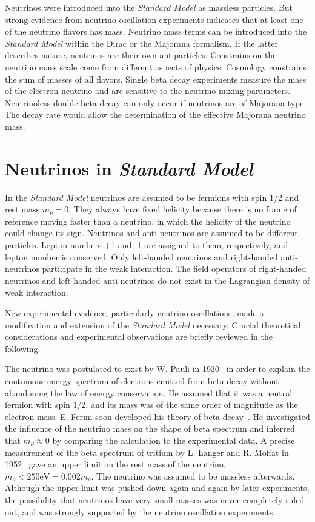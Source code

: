 Neutrinos were introduced into the \emph{Standard Model} as massless particles. But strong evidence from neutrino oscillation experiments indicates that at least one of the neutrino flavors has mass. Neutrino mass terms can be introduced into the \emph{Standard Model} within the Dirac or the Majorana formalism. If the latter describes nature, neutrinos are their own antiparticles. Constrains on the neutrino mass scale come from different aspects of physics. Cosmology constrains the sum of masses of all flavors. Single beta decay experiments measure the mass of the electron neutrino and are sensitive to the neutrino mixing parameters. Neutrinoless double beta decay can only occur if neutrinos are of Majorana type. The decay rate would allow the determination of the effective Majorana neutrino mass.

\section{Neutrinos in \emph{Standard Model}}
\label{sec:sm}
In the \emph{Standard Model} neutrinos are assumed to be fermions with spin 1/2 and rest mass $m_\nu=0$. They always have fixed helicity because there is no frame of reference moving faster than a neutrino, in which the helicity of the neutrino could change its sign. Neutrinos and anti-neutrinos are assumed to be different particles. Lepton numbers +1 and -1 are assigned to them, respectively, and lepton number is conserved. Only left-handed neutrinos and right-handed anti-neutrinos participate in the weak interaction. The field operators of right-handed neutrinos and left-handed anti-neutrinos do not exist in the Lagrangian density of weak interaction.

New experimental evidence, particularly neutrino oscillations, made a modification and extension of the \emph{Standard Model} necessary. Crucial theoretical considerations and experimental observations are briefly reviewed in the following.

The neutrino was postulated to exist by W. Pauli in 1930~\cite{Pau30} in order to explain the continuous energy spectrum of electrons emitted from beta decay without abandoning the law of energy conservation. He assumed that it was a neutral fermion with spin 1/2, and its mass was of the same order of magnitude as the electron mass. E.  Fermi soon developed his theory of beta decay~\cite{Fer33,Fer34}. He investigated the influence of the neutrino mass on the shape of beta spectrum and inferred that $m_\nu \approx 0$ by comparing the calculation to the experimental data. A precise measurement of the beta spectrum of tritium by L. Langer and R. Moffat in 1952~\cite{Lan52} gave an upper limit on the rest mass of the neutrino, $m_\nu < 250 \mbox{eV} = 0.002m_e$. The neutrino was assumed to be massless afterwards. Although the upper limit was pushed down again and again by later experiments, the possibility that neutrinos have very small masses was never completely ruled out, and was strongly supported by the neutrino oscillation experiments.

